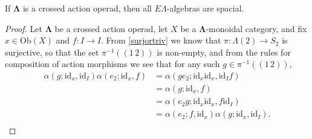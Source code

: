 \documentclass{amsbook} %
\newcommand{\id}{\textrm{id}}
\newcommand{\ML}{\mathbf{\Lambda}}
\numberwithin{section}{chapter}
\begin{document}
\begin{lem}\label{spacial} If $\ML$ is a crossed action operad, then all $E\Lambda$-algebras are spacial.\end{lem}
\begin{proof}
Let $\ML$ be a crossed action operad, let $X$ be a $\ML$-monoidal category, and fix $x \in \mathrm{Ob}(X)$ and \( f\colon I \to I \). From \cref{surjortriv} we know that \( \pi \colon \Lambda(2) \to S_2 \) is surjective, so that the set $\pi^{-1}(  (1 \, 2)  )$ is non-empty, and from the rules for composition of action morphisms we see that for any such $g \in \pi^{-1}(  (1 \, 2)  )$,
  \begin{align*}
    \alpha(g  ;  \id_x,  \id_I  )\alpha(  e_2  ;  \id_x,  f  ) &= \alpha(ge_2 ; \id_x \id_x, \id_I f)\\
    &= \alpha(g  ;  \id_x, f) \\
    &= \alpha(e_2 g; \id_x \id_x, f \id_I) \\
    &= \alpha(e_2; f, \id_x )\alpha(g; \id_x, \id_I). \\
  \end{align*}


\end{proof}
\end{document}
